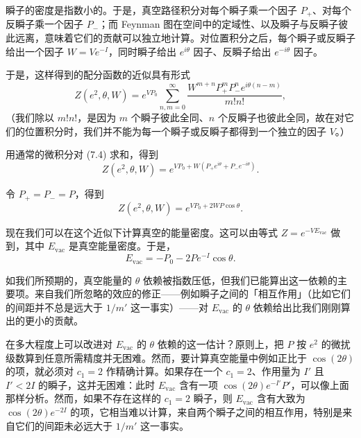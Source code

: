 瞬子的密度是指数小的。于是，真空路径积分对每个瞬子乘一个因子 $P_+$、对每个反瞬子乘一个因子 $P_-$；而 Feynman 图在空间中的定域性、以及瞬子与反瞬子彼此远离，意味着它们的贡献可以独立地计算。对位置积分之后，每个瞬子或反瞬子给出一个因子 $W=Ve^{-I}$，同时瞬子给出 $e^{i\theta}$ 因子、反瞬子给出 $e^{-i\theta}$ 因子。

于是，这样得到的配分函数的近似具有形式
\begin{equation}
  \tag{7.4}
  \label{eq:7-4}
  Z(e^2,\theta,W)=e^{VP_0}\sum_{n,m=0}^{\infty}\frac{W^{m+n}P_+^mP_-^n e^{i\theta(n-m)}}{m!n!},
\end{equation}
（我们除以 $m!n!$，是因为 $m$ 个瞬子彼此全同、$n$ 个反瞬子也彼此全同，故在对它们的位置积分时，我们并不能为每一个瞬子或反瞬子都得到一个独立的因子 $V$。）

用通常的微积分对 (7.4) 求和，得到
\begin{equation}
  \tag{7.5}
  \label{eq:7-5}
  Z(e^2,\theta,W)=e^{VP_0+W(P_+e^{i\theta}+P_-e^{-i\theta})}.
\end{equation}

令 $P_+=P_-=P$，得到
\begin{equation}
  \tag{7.6}
  \label{eq:7-6}
  Z(e^2,\theta,W)=e^{VP_0+2WP\cos\theta}.
\end{equation}

现在我们可以在这个近似下计算真空的能量密度。这可以由等式 $Z=e^{-VE_{\mathrm{vac}}}$ 做到，其中 $E_{\mathrm{vac}}$ 是真空能量密度。于是，
\begin{equation}
  \tag{7.7}
  \label{eq:7-7}
  E_{\mathrm{vac}}=-P_0-2Pe^{-I}\cos\theta.
\end{equation}

如我们所预期的，真空能量的 $\theta$ 依赖被指数压低，但我们已能算出这一依赖的主要项。来自我们所忽略的效应的修正——例如瞬子之间的「相互作用」（比如它们的间距并不总是远大于 $1/m'$ 这一事实）——对 $E_{\mathrm{vac}}$ 的 $\theta$ 依赖给出比我们刚刚算出的更小的贡献。

在多大程度上可以改进对 $E_{\mathrm{vac}}$ 的 $\theta$ 依赖的这一估计？原则上，把 $P$ 按 $e^2$ 的微扰级数算到任意所需精度并无困难。然而，要计算真空能量中例如正比于 $\cos(2\theta)$ 的项，就必须对 $c_1=2$ 作精确计算。如果存在一个 $c_1=2$、作用量为 $I'$ 且 $I'<2I$ 的瞬子，这并无困难：此时 $E_{\mathrm{vac}}$ 含有一项 $\cos(2\theta)e^{-I'}P'$，可以像上面那样分析。然而，如果不存在这样的 $c_1=2$ 瞬子，则 $E_{\mathrm{vac}}$ 含有大致为 $\cos(2\theta)e^{-2I}$ 的项，它相当难以计算，来自两个瞬子之间的相互作用，特别是来自它们的间距未必远大于 $1/m'$ 这一事实。

